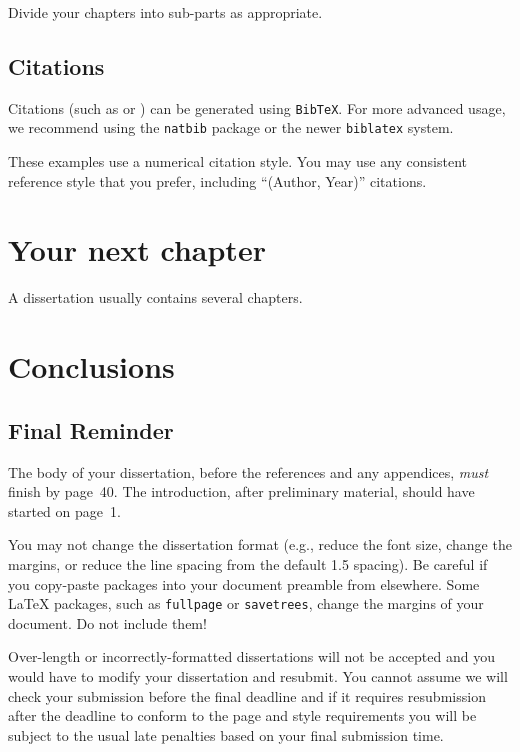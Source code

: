 \documentclass[logo,msc,draft]{infthesis}     %
\begin{document}
Divide your chapters into sub-parts as appropriate.

\section{Citations}

Citations (such as \cite{P1} or \cite{P2}) can be generated using
\texttt{BibTeX}. For more advanced usage, we recommend using the \texttt{natbib}
package or the newer \texttt{biblatex} system.

These examples use a numerical citation style. You may use any consistent
reference style that you prefer, including ``(Author, Year)'' citations.

\chapter{Your next chapter}

A dissertation usually contains several chapters.

\chapter{Conclusions}

\section{Final Reminder}

The body of your dissertation, before the references and any appendices,
\emph{must} finish by page~40. The introduction, after preliminary material,
should have started on page~1.

You may not change the dissertation format (e.g., reduce the font size, change
the margins, or reduce the line spacing from the default 1.5 spacing). Be
careful if you copy-paste packages into your document preamble from elsewhere.
Some \LaTeX{} packages, such as \texttt{fullpage} or \texttt{savetrees}, change
the margins of your document. Do not include them!

Over-length or incorrectly-formatted dissertations will not be accepted and you
would have to modify your dissertation and resubmit. You cannot assume we will
check your submission before the final deadline and if it requires resubmission
after the deadline to conform to the page and style requirements you will be
subject to the usual late penalties based on your final submission time.



\end{document}

